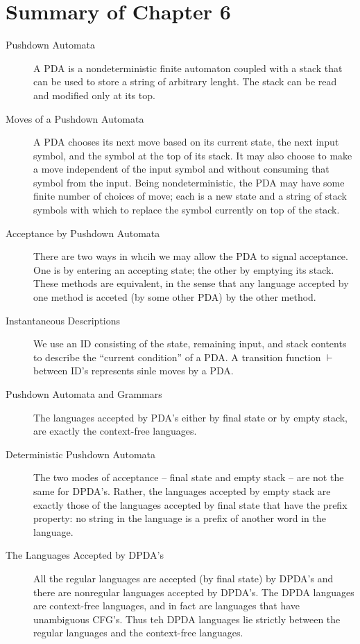 \documentclass[]{article}
\begin{document}
\section*{Summary of Chapter 6}
  \begin{description}
    \item[Pushdown Automata] A PDA is a nondeterministic finite automaton
    coupled with a stack that can be used to store a string of arbitrary lenght.
    The stack can be read and modified only at its top.
    \item[Moves of a Pushdown Automata] A PDA chooses its next move based on its
    current state, the next input symbol, and the symbol at the top of its
    stack. It may also choose to make a move independent of the input symbol and
    without consuming that symbol from the input. Being nondeterministic, the
    PDA may have some finite number of choices of move; each is a new state and
    a string of stack symbols with which to replace the symbol currently on top
    of the stack.
    \item[Acceptance by Pushdown Automata] There are two ways in whcih we may
    allow the PDA to signal acceptance. One is by entering an accepting state;
    the other by emptying its stack. These methods are equivalent, in the sense
    that any language accepted by one method is acceted (by some other PDA) by
    the other method.
    \item[Instantaneous Descriptions] We use an ID consisting of the state,
    remaining input, and stack contents to describe the ``current condition'' of
    a PDA. A transition function $\vdash$ between ID's represents sinle moves by
    a PDA.
    \item[Pushdown Automata and Grammars] The languages accepted by PDA's either
    by final state or by empty stack, are exactly the context-free languages.
    \item[Deterministic Pushdown Automata] The two modes of acceptance -- final
    state and empty stack -- are not the same for DPDA's. Rather, the languages
    accepted by empty stack are exactly those of the languages accepted by final
    state that have the prefix property: no string in the language is a prefix
    of another word in the language.
    \item[The Languages Accepted by DPDA's] All the regular languages are
    accepted (by final state) by DPDA's and there are nonregular languages
    accepted by DPDA's. The DPDA languages are context-free languages, and in
    fact are languages that have unambiguous CFG's. Thus teh DPDA languages lie
    strictly between the regular languages and the context-free languages.
  \end{description}
\end{document}
